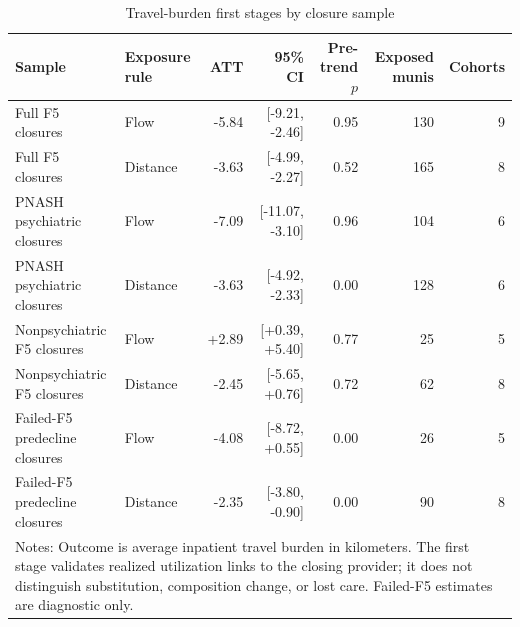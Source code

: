 \begin{table}[!htbp]\centering
\caption{Travel-burden first stages by closure sample}
\label{tab:first-stage-by-sample}
\small
\begin{tabular}{llrrrrr}
\toprule
Sample & Exposure rule & ATT & 95\% CI & Pre-trend $p$ & Exposed munis & Cohorts \\
\midrule
Full F5 closures & Flow & -5.84 & [-9.21, -2.46] & 0.95 & 130 & 9 \\
Full F5 closures & Distance & -3.63 & [-4.99, -2.27] & 0.52 & 165 & 8 \\
PNASH psychiatric closures & Flow & -7.09 & [-11.07, -3.10] & 0.96 & 104 & 6 \\
PNASH psychiatric closures & Distance & -3.63 & [-4.92, -2.33] & 0.00 & 128 & 6 \\
Nonpsychiatric F5 closures & Flow & +2.89 & [+0.39, +5.40] & 0.77 & 25 & 5 \\
Nonpsychiatric F5 closures & Distance & -2.45 & [-5.65, +0.76] & 0.72 & 62 & 8 \\
Failed-F5 predecline closures & Flow & -4.08 & [-8.72, +0.55] & 0.00 & 26 & 5 \\
Failed-F5 predecline closures & Distance & -2.35 & [-3.80, -0.90] & 0.00 & 90 & 8 \\
\bottomrule
\multicolumn{7}{p{0.92\textwidth}}{\footnotesize Notes: Outcome is average inpatient travel burden in kilometers. The first stage validates realized utilization links to the closing provider; it does not distinguish substitution, composition change, or lost care. Failed-F5 estimates are diagnostic only.}\\
\end{tabular}
\end{table}
